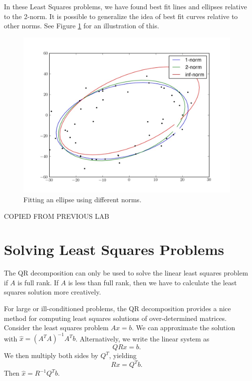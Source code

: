 In these Least Squares problems, we have found best fit lines and ellipses relative to the 2-norm.
It is possible to generalize the idea of best fit curves relative to other norms.
See Figure \ref{Fig:ellipse} for an illustration of this.

\begin{figure}[h]
\label{ellipsefit}
\centering
\includegraphics[width=\textwidth]{ellipsefit.pdf}
\caption{Fitting an ellipse using different norms.}
\label{Fig:ellipse}
\end{figure} 

COPIED FROM PREVIOUS LAB

\section*{Solving Least Squares Problems}
The QR decomposition can only be used to solve the linear least squares problem if $A$ is full rank. If $A$ is less than full rank, then we have to calculate the least squares solution more creatively.



For large or ill-conditioned problems, the QR decomposition provides a nice method for computing least squares solutions of over-determined matrices.
Consider the least squares problem $Ax=b$. We can approximate the solution with $\widehat x = (A^T A)^{-1}A^T b$.
Alternatively, we write the linear system as
\[ Q R x = b. \]
We then multiply both sides by $Q^T$, yielding
\[ R x = Q^T b. \]
Then $\widehat x = R^{-1} Q^T b$.

